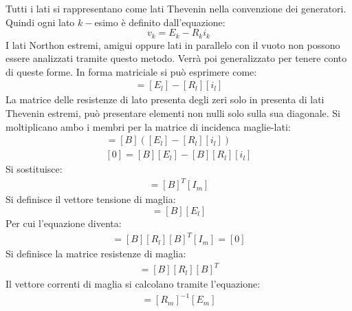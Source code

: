 \documentclass{article}
\numberwithin{equation}{subsection}
\begin{document}
Tutti i lati si rappresentano come lati Thevenin nella convenzione dei generatori. Quindi ogni lato $k-$esimo è definito dall'equazione:
\begin{equation*}
    v_k=E_k-R_ki_k
\end{equation*}
I lati Northon estremi, amigui oppure lati in parallelo con il vuoto non possono essere analizzati tramite questo metodo. Verrà poi generalizzato per tenere conto di queste 
forme. In forma matriciale si può esprimere come:
\begin{gather*}
    [v_l]=[E_l]-[R_l][i_l]
\end{gather*}
La matrice delle resistenze di lato presenta degli zeri solo in presenta di lati Thevenin estremi, può presentare elementi non nulli solo sulla sua diagonale. 
Si moltiplicano ambo i membri per la matrice di incidenca maglie-lati:
\begin{gather*}
    [B][v_l]=[B]\left([E_l]-[R_l][i_l]\right)\\
    [0]=[B][E_l]-[B][R_l][i_l]
\end{gather*}
Si sostituisce:
\begin{gather*}
    [i_l]=[B]^T[I_m]
\end{gather*}
Si definisce il vettore tensione di maglia:
\begin{equation*}
    [E_m]=[B][E_l]
\end{equation*}
Per cui l'equazione diventa:
\begin{gather*}
    [E_m]=[B][R_l][B]^T[I_m]=[0]
\end{gather*}
Si definisce la matrice resistenze di maglia:
\begin{gather*}
    [R_m]=[B][R_l][B]^T
\end{gather*}
Il vettore correnti di maglia si calcolano tramite l'equazione:
\begin{gather*}
    [I_m]=[R_m]^{-1}[E_m]
\end{gather*}
\end{document}
